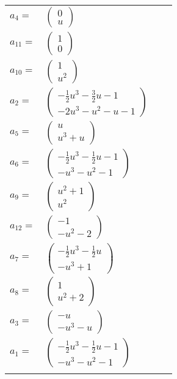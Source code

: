 \documentclass[1p]{elsarticle_modified}
\theoremstyle{definition}
\begin{document}
\begin{tabular}{m{7pt} m{180pt} m{7pt} m{180pt} }
\flushright $a_{4}=$&$\begin{pmatrix}0\\u\end{pmatrix}$ \\
\flushright $a_{11}=$&$\begin{pmatrix}1\\0\end{pmatrix}$ \\
\flushright $a_{10}=$&$\begin{pmatrix}1\\u^2\end{pmatrix}$ \\
\flushright $a_{2}=$&$\begin{pmatrix}-\frac{1}{2} u^3-\frac{3}{2} u-1\\-2 u^3- u^2- u-1\end{pmatrix}$ \\
\flushright $a_{5}=$&$\begin{pmatrix}u\\u^3+u\end{pmatrix}$ \\
\flushright $a_{6}=$&$\begin{pmatrix}-\frac{1}{2} u^3-\frac{1}{2} u-1\\- u^3- u^2-1\end{pmatrix}$ \\
\flushright $a_{9}=$&$\begin{pmatrix}u^2+1\\u^2\end{pmatrix}$ \\
\flushright $a_{12}=$&$\begin{pmatrix}-1\\- u^2-2\end{pmatrix}$ \\
\flushright $a_{7}=$&$\begin{pmatrix}-\frac{1}{2} u^3-\frac{1}{2} u\\- u^3+1\end{pmatrix}$ \\
\flushright $a_{8}=$&$\begin{pmatrix}1\\u^2+2\end{pmatrix}$ \\
\flushright $a_{3}=$&$\begin{pmatrix}- u\\- u^3- u\end{pmatrix}$ \\
\flushright $a_{1}=$&$\begin{pmatrix}-\frac{1}{2} u^3-\frac{1}{2} u-1\\- u^3- u^2-1\end{pmatrix}$\\&\end{tabular}
\end{document}
